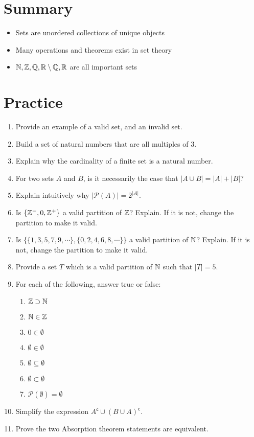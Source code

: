 \documentclass[main.tex]{subfiles}
\begin{document}
\section{Summary}

\begin{itemize}
	\item Sets are unordered collections of unique objects
	\item Many operations and theorems exist in set theory
	\item \(\mathbb{N}, \mathbb{Z}, \mathbb{Q}, \mathbb{R} \setminus \mathbb{Q}, \mathbb{R}\) are all important sets
\end{itemize}

\section{Practice}

\begin{enumerate}
	\item Provide an example of a valid set, and an invalid set.
	\item Build a set of natural numbers that are all multiples of 3.
	\item Explain why the cardinality of a finite set is a natural number.
	\item For two sets \(A\) and \(B\), is it necessarily the case that \(|A \cup B| = |A| + |B|\)?
	\item Explain intuitively why \(|\mathcal{P}(A)| = 2^{|A|}\).
	\item Is \(\{\mathbb{Z}^-, 0, \mathbb{Z}^+\}\) a valid partition of \(\mathbb{Z}\)? Explain. If it is not, change the partition to make it valid.
	\item Is \(\{\{1,3,5,7,9,\cdots\} , \{0,2,4,6,8,\cdots\}\}\) a valid partition of \(\mathbb{N}\)? Explain. If it is not, change the partition to make it valid.
	\item Provide a set \(T\) which is a valid partition of \(\mathbb{N}\) such that \(|T| = 5\).
	\item For each of the following, answer true or false:
	\begin{enumerate}
		\item \(\mathbb{Z} \supset \mathbb{N}\)
		\item \(\mathbb{N} \in \mathbb{Z}\)
		\item \(0 \in \emptyset\)
		\item \(\emptyset \in \emptyset\)
		\item \(\emptyset \subseteq \emptyset\)
		\item \(\emptyset \subset \emptyset\)
		\item \(\mathcal{P}(\emptyset) = \emptyset\)
	\end{enumerate}
	\item Simplify the expression \(A^{\mathsf{c}} \cup (B \cup A)^{\mathsf{c}}\).
	\item Prove the two Absorption theorem statements are equivalent.
\end{enumerate}
\end{document}
